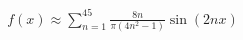\documentclass[preview]{standalone}
\begin{document}
\begin{align*}
f(x) \approx \sum_{n=1}^{45} \frac{8n}{\pi(4n^2-1)} \sin(2nx)
\end{align*}
\end{document}
